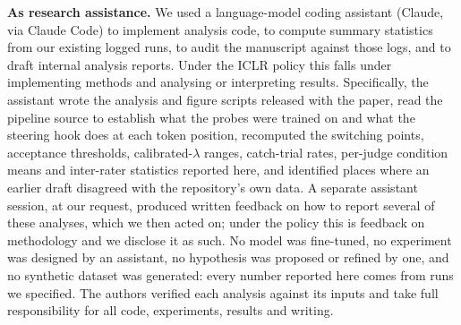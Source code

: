 \textbf{As research assistance.} We used a language-model coding assistant
(Claude, via Claude Code) to implement analysis code, to compute summary
statistics from our existing logged runs, to audit the manuscript against those
logs, and to draft internal analysis reports. Under the ICLR policy this falls
under implementing methods and analysing or interpreting results. Specifically,
the assistant wrote the analysis and figure scripts released with the paper, read
the pipeline source to establish what the probes were trained on and what the
steering hook does at each token position, recomputed the switching points,
acceptance thresholds, calibrated-$\lambda$ ranges, catch-trial rates,
per-judge condition means and inter-rater statistics reported here, and
identified places where an earlier draft disagreed with the repository's own
data. A separate assistant session, at our request, produced written feedback on
how to report several of these analyses, which we then acted on; under the policy
this is feedback on methodology and we disclose it as such. No model was
fine-tuned, no experiment was designed by an assistant, no hypothesis was
proposed or refined by one, and no synthetic dataset was generated: every number
reported here comes from runs we specified. The authors verified each analysis
against its inputs and take full responsibility for all code, experiments,
results and writing.
